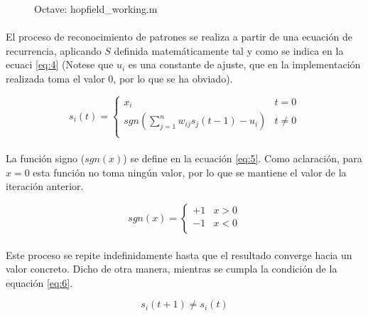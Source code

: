 \documentclass[10pt, a4paper,spanish]{article}
\begin{document}
		\begin{figure}[htpb!]
			\centering
			\inputminted{octave}{../src/hopfield_working.m}
			\caption{Octave: hopfield\_working.m}
			\label{code:working}
		\end{figure}

		\paragraph{}
		El proceso de reconocimiento de patrones se realiza a partir de una ecuación de recurrencia, aplicando $S$ definida matemáticamente tal y como se indica en la ecuaci \ref{eq:4} (Notese que $u_{i}$ es una constante de ajuste, que en la implementación realizada toma el valor $0$, por lo que se ha obviado).

		\begin{equation} \label{eq:4}
		 	s_i(t) =
		 	\begin{cases}
      	x_i 																					& t = 0 		\\
      	sgn(\sum_{j=1}^{n} w_{ij}s_{j}(t-1) - u_{i}) 	& t \neq 0 	\\
   		\end{cases}
		\end{equation}

		\paragraph{}
		La función signo ($sgn(x)$) se define en la ecuación \ref{eq:5}. Como aclaración, para $x = 0$ esta función no toma ningún valor, por lo que se mantiene el valor de la iteración anterior.

		\begin{equation} \label{eq:5}
			sgn(x) =
			\begin{cases}
				+1 & x > 0 \\
				-1 & x < 0 \\
			\end{cases}
		\end{equation}

		\paragraph{}
		Este proceso se repite indefinidamente hasta que el resultado converge hacia un valor concreto. Dicho de otra manera, mientras se cumpla la condición de la equación \ref{eq:6}.

		\begin{equation} \label{eq:6}
			s_i(t+1) \neq s_i(t)
		\end{equation}
\end{document}
